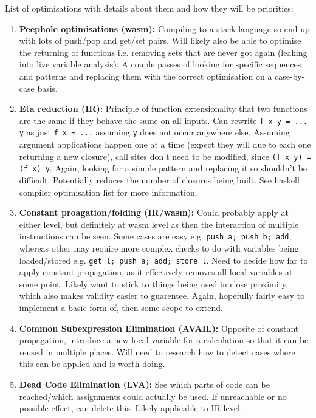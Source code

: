 \documentclass[10pt,twoside,a4paper]{article}
\begin{document}

List of optimisations with details about them and how they will be priorities:

\begin{enumerate}
\item \textbf{Peephole optimisations (wasm): } Compiling to a stack language so end up with lots of push/pop and get/set pairs. Will likely also  be able to optimise the returning of functions i.e. removing sets that are never got again (leaking into live variable analysis). A couple passes of looking for specific sequences and patterns and replacing them with the correct optimisation on a case-by-case basis.

\item \textbf{Eta reduction (IR): } Principle of function extensionality that two functions are the same if they behave the same on all inputs. Can rewrite \verb|f x y = ... y| as just \verb|f x = ...| assuming \verb|y| does not occur anywhere else. Assuming argument applications happen one at a time (expect they will due to each one returning a new closure), call sites don't need to be modified, since \verb|(f x y) = (f x) y|. Again, looking for a simple pattern and replacing it so shouldn't be difficult. Potentially reduces the number of closures being built. See haskell compiler optimisation list for more information.

\item \textbf{Constant proagation/folding (IR/wasm): } Could probably apply at either level, but definitely at wasm level as then the interaction of multiple instructions can be seen. Some cases are easy e.g. \verb|push a; push b; add|, whereas other may require more complex checks to do with variables being loaded/stored e.g. \verb|get l; push a; add; store l|. Need to decide how far to apply constant propagation, as it effectively removes all local variables at some point. Likely want to stick to things being used in close proximity, which also makes validity easier to guarentee. Again, hopefully fairly easy to implement a basic form of, then some scope to extend. 

\item \textbf{Common Subexpression Elimination (AVAIL): } Opposite of constant propagation, introduce a new local variable for a calculation so that it can be reused in multiple places. Will need to research how to detect cases where this can be applied and is worth doing.

\item \textbf{Dead Code Elimination (LVA): }See which parts of code can be reached/which assignments could actually be used. If unreachable or no possible effect, can delete this. Likely applicable to IR level.


\end{enumerate}
\end{document}
